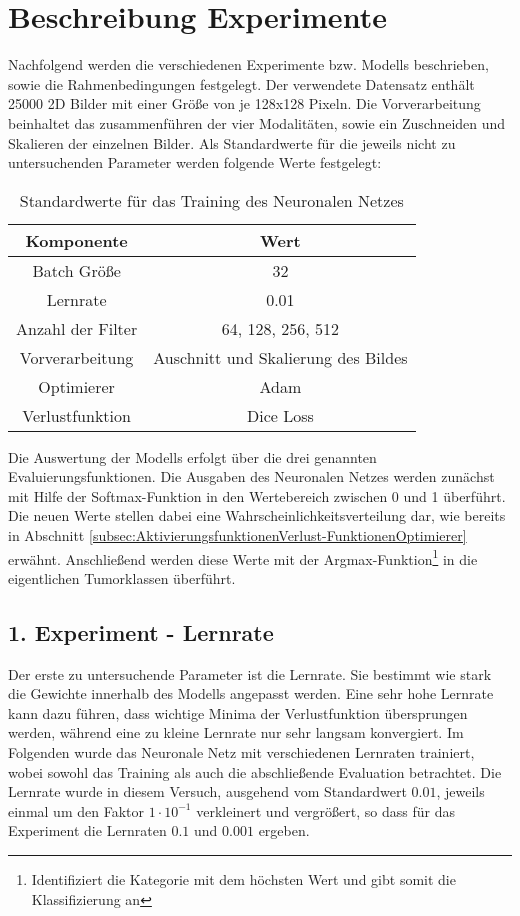 \section{Beschreibung Experimente}
Nachfolgend werden die verschiedenen Experimente bzw. \glspl{Modell} beschrieben, sowie die Rahmenbedingungen festgelegt. Der verwendete Datensatz enthält 25000 2D Bilder mit einer Größe von je 128x128 Pixeln. Die Vorverarbeitung beinhaltet das zusammenführen der vier Modalitäten, sowie ein Zuschneiden und Skalieren der einzelnen Bilder. Als Standardwerte für die jeweils nicht zu untersuchenden Parameter werden folgende Werte festgelegt:
\begin{table}[h!]
\begin{longtable}{|c|c|}
	\hline
		\multicolumn{1}{|c|}{\textbf{Komponente}} & \multicolumn{1}{c|}{\textbf{Wert}} \\
		\endhead
	\hline
		Batch Größe & 32 \\
	\hline
		Lernrate & 0.01 \\
	\hline
		Anzahl der Filter & 64, 128, 256, 512 \\
	\hline
		Vorverarbeitung & Auschnitt und Skalierung des Bildes \\
	\hline
		Optimierer & Adam \\
	\hline
		Verlustfunktion & Dice Loss \\
	\hline
\end{longtable}
\caption{Standardwerte für das Training des Neuronalen Netzes}
\label{table:StandardWerte}
\end{table}
Die Auswertung der \glspl{Modell} erfolgt über die drei genannten Evaluierungsfunktionen. Die Ausgaben des Neuronalen Netzes werden zunächst mit Hilfe der Softmax-Funktion in den Wertebereich zwischen 0 und 1 überführt. Die neuen Werte stellen dabei eine Wahrscheinlichkeitsverteilung dar, wie bereits in Abschnitt \ref{subsec:AktivierungsfunktionenVerlust-FunktionenOptimierer} erwähnt. Anschließend werden diese Werte mit der Argmax-Funktion\footnote{Identifiziert die Kategorie mit dem höchsten Wert und gibt somit die Klassifizierung an} in die eigentlichen Tumorklassen überführt.

\subsection{1. Experiment - Lernrate}
Der erste zu untersuchende Parameter ist die Lernrate. Sie bestimmt wie stark die Gewichte innerhalb des \gls{Modell}s angepasst werden. Eine sehr hohe Lernrate kann dazu führen, dass wichtige Minima der Verlustfunktion übersprungen werden, während eine zu kleine Lernrate nur sehr langsam konvergiert. Im Folgenden wurde das Neuronale Netz mit verschiedenen Lernraten trainiert, wobei sowohl das Training als auch die abschließende Evaluation betrachtet. Die Lernrate wurde in diesem Versuch, ausgehend vom Standardwert $0.01$, jeweils einmal um den Faktor $1\cdot 10^{-1}$ verkleinert und vergrößert, so dass für das Experiment die Lernraten $0.1$ und $0.001$ ergeben.

